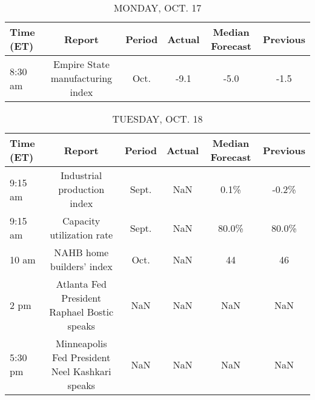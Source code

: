 \documentclass{article}%
\begin{document}
%
\normalsize%


\begin{table}[htbp]%
\caption{MONDAY, OCT. 17}%
\centering%
\begin{adjustbox}{width=1\textwidth}%
\begin{tabular}{lccccc}
\toprule
Time (ET) &                           Report & Period & Actual & Median Forecast & Previous \\
\midrule
  8:30 am & Empire State manufacturing index &   Oct. &   -9.1 &            -5.0 &     -1.5 \\
\bottomrule
\end{tabular}
%
\end{adjustbox}%
\end{table}

%


\begin{table}[htbp]%
\caption{TUESDAY, OCT. 18}%
\centering%
\begin{adjustbox}{width=1\textwidth}%
\begin{tabular}{lccccc}
\toprule
Time (ET) &                                         Report & Period & Actual & Median Forecast & Previous \\
\midrule
  9:15 am &                    Industrial production index &  Sept. &    NaN &            0.1\% &    -0.2\% \\
  9:15 am &                      Capacity utilization rate &  Sept. &    NaN &           80.0\% &    80.0\% \\
    10 am &                      NAHB home builders' index &   Oct. &    NaN &              44 &       46 \\
     2 pm &    Atlanta Fed President Raphael Bostic speaks &    NaN &    NaN &             NaN &      NaN \\
  5:30 pm & Minneapolis Fed President Neel Kashkari speaks &    NaN &    NaN &             NaN &      NaN \\
\bottomrule
\end{tabular}
%
\end{adjustbox}%
\end{table}

%
\end{document}
